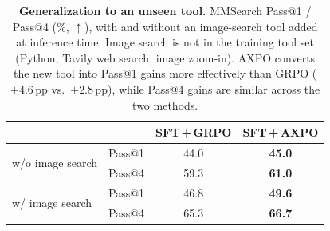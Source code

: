 \begin{table}[t]
    \caption{\textbf{Generalization to an unseen tool.} MMSearch Pass@1 / Pass@4 (\%, $\uparrow$), with and without an image-search tool added at inference time. Image search is not in the training tool set (Python, Tavily web search, image zoom-in). AXPO converts the new tool into Pass@1 gains more effectively than GRPO ($+4.6$\,pp vs.\ $+2.8$\,pp), while Pass@4 gains are similar across the two methods.}
    \label{tab:image-search-gen}
    \centering
    \small
    \begin{tabular}{l l c c}
        \toprule
        & & SFT\,+\,GRPO & SFT\,+\,AXPO \\
        \midrule
        \multirow{2}{*}{w/o image search}
            & Pass@1 & 44.0 & \bf 45.0 \\
            & Pass@4 & 59.3 & \bf 61.0 \\
        \midrule
        \multirow{2}{*}{w/\phantom{o} image search}
            & Pass@1 & 46.8 & \textbf{49.6} \\
            & Pass@4 & 65.3 & \textbf{66.7} \\
        \bottomrule
    \end{tabular}
\end{table}
